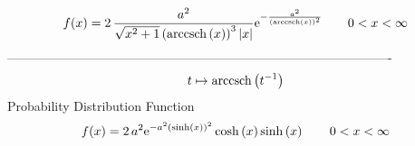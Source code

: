 \documentclass[12pt]{article}
\begin{document}
$$  f(x)=2\,{\frac {{a}^{2}}{\sqrt {{x}^{2}+1} \left( {\rm arccsch} \left(x
\right) \right) ^{3} \left| x \right| }{{\rm e}^{-{\frac {{a}^{2}}{
 \left( {\rm arccsch} \left(x\right) \right) ^{2}}}}}}
 \qquad0
 < x < \infty 
$$-------------------------------------------------------------------------------------------  \\$$t\mapsto {\rm arccsch} \left({t}^{-1}\right)
$$Probability Distribution Function 
$$  f(x)=2\,{a}^{2}{{\rm e}^{-{a}^{2} \left( \sinh \left( x \right)  \right) ^{
2}}}\cosh \left( x \right) \sinh \left( x \right) 
 \qquad0
 < x < \infty 
$$
\end{document}

